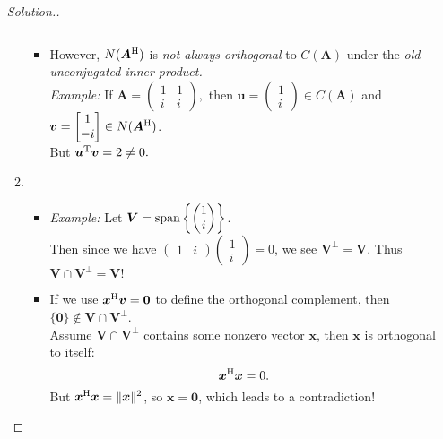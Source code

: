 \begin{enumerate}
\begin{proof}[Solution.]
\begin{enumerate}
\begin{itemize}
\[\]
\item
However, $N(\bm A^{\mathrm H})$ is \textit{not always orthogonal} to $C(\bm A)$ under the \emph{old unconjugated inner product.}\\
\emph{Example: }If $\bm A=\begin{pmatrix}
1&1\\i&i
\end{pmatrix},$ then $\bm u=\begin{pmatrix}
1\\i
\end{pmatrix}\in C(\bm A)$ and $\bm v=\begin{bmatrix}
1\\-i
\end{bmatrix}\in N(\bm A^{\mathrm H})$.\\ But $\bm u^{\mathrm T}\bm v=2\ne0.$
\end{itemize}
\item
\begin{itemize}
\item
\emph{Example: }Let $\bm V=\operatorname{span}\left\{\begin{pmatrix}
1\\i
\end{pmatrix}\right\}$.\\
Then since we have $\begin{pmatrix}
1&i
\end{pmatrix}\begin{pmatrix}
1\\i
\end{pmatrix}=0$, we see $\bm V^{\perp}=\bm V$. Thus $\bm V\cap\bm V^{\perp}=\bm V!$
\item
If we use $\bm x^{\mathrm H}\bm v=\bm0$ to define the orthogonal complement, then $\{\bm 0\}\notin\bm V\cap\bm V^{\perp}$.\\
Assume $\bm V\cap\bm V^{\perp}$ contains some nonzero vector $\bm x$, then $\bm x$ is orthogonal to itself:
\[
\bm x^{\mathrm H}\bm x=0.
\]
But $\bm x^{\mathrm H}\bm x=\|\bm x\|^2$, so $\bm x=\bm 0$, which leads to a contradiction!
\end{itemize}


\end{enumerate}




\end{proof}
\end{enumerate}